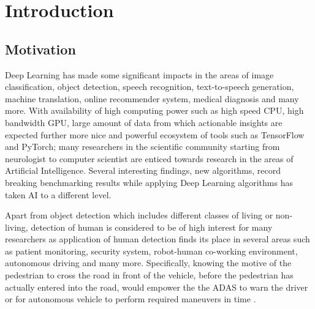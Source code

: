 \pagestyle{fancy}
\fancyhf{}
\fancyhead[EL]{\leftmark} %
\fancyhead[OL]{\leftmark}
\fancyhead[ER,OR]{\thepage}

\setcounter{page}{1}

\chapter{Introduction}
\section{Motivation}
Deep Learning has made some significant impacts in the areas of image classification, 
object detection, speech recognition, text-to-speech generation, machine translation,
online recommender system, medical diagnosis and many more. With availability of high 
computing power such as high speed CPU, high bandwidth GPU, large amount of 
data from which actionable insights are expected further more nice and powerful ecosystem of  
tools such as TensorFlow and PyTorch; many researchers in the scientific community 
starting from neurologist to computer scientist are enticed towards research in the areas 
of Artificial Intelligence. Several interesting findings, new algorithms, record 
breaking benchmarking results while applying Deep Learning algorithms has taken 
AI to a different level.

\newpara Apart from object detection which includes different classes of living or non-living, detection of human is considered to be of high interest for many researchers as application of human detection finds its place in several areas such as patient monitoring, security system, robot-human co-working environment, autonomous driving and many more. Specifically, knowing the motive of the pedestrian to cross the road in front of the vehicle, before the pedestrian has actually entered into the road, would empower the the ADAS to warn the driver or for autonomous vehicle to perform required maneuvers in time .

